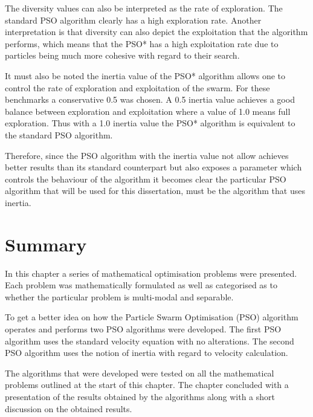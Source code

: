 The diversity values can also be interpreted as the rate of exploration. The standard PSO algorithm clearly has a high exploration rate. Another interpretation is that diversity can also depict the exploitation that the algorithm performs, which means that the PSO* has a high exploitation rate due to particles being much more cohesive with regard to their search.

It must also be noted the inertia value of the PSO* algorithm allows one to control the rate of exploration and exploitation of the swarm. For these benchmarks a conservative 0.5 was chosen. A 0.5 inertia value achieves a good balance between exploration and exploitation where a value of 1.0 means full exploration. Thus with a 1.0 inertia value the PSO* algorithm is equivalent to the standard PSO algorithm.

Therefore, since the PSO algorithm with the inertia value not allow achieves better results than its standard counterpart but also exposes a parameter which controls the behaviour of the algorithm it becomes clear the particular PSO algorithm that will be used for this dissertation, must be the algorithm that uses inertia.
\section{Summary}
In this chapter a series of mathematical optimisation problems were presented. Each problem was mathematically formulated as well as categorised as to whether the particular problem is multi-modal and separable.

To get a better idea on how the Particle Swarm Optimisation (PSO) algorithm operates and performs two PSO algorithms were developed. The first PSO algorithm uses the standard velocity equation with no alterations. The second PSO algorithm uses the notion of inertia with regard to velocity calculation.

The algorithms that were developed were tested on all the mathematical problems outlined at the start of this chapter. The chapter concluded with a presentation of the results obtained by the algorithms along with a short discussion on the obtained results.

